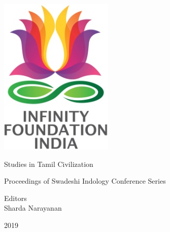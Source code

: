 \thispagestyle{empty}

\includegraphics{images/logo.png}

Studies in Tamil Civilization


Proceedings of Swadeshi Indology Conference Series

Editors\\ Sharda Narayanan


2019

